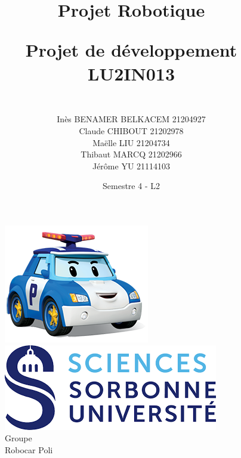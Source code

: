 \documentclass[12pt]{article}
\title{\textbf{Projet Robotique} 

Projet de développement\\
LU2IN013 }
\author{\\Inès BENAMER BELKACEM 21204927\\Claude CHIBOUT 21202978 \\ Maëlle LIU 21204734\\ Thibaut MARCQ 21202966\\ Jérôme YU 21114103}
\date{Semestre 4 - L2}
\begin{document}
\maketitle
\vspace{2cm}
\begin{figure}[h]
  \centering
  \begin{minipage}[t]{0.35\textwidth}
    \centering
    \includegraphics[width=0.8\linewidth]{robocar.png}
    \caption*{Groupe \\ Robocar Poli}
  \end{minipage}
  \hspace{0.05\textwidth} %
  \begin{minipage}[t]{0.45\textwidth}
    \centering
    \includegraphics[width=0.8\linewidth]{Sciences_SU.png}
  \end{minipage}
\end{figure}


\newpage

\renewcommand*\contentsname{Sommaire}
\tableofcontents
\vspace{2cm}
\end{document}
